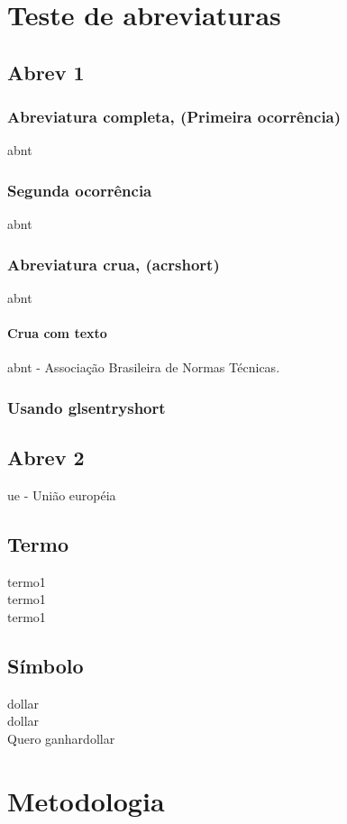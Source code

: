 \documentclass[12pt,a4paper,oneside,brazil]{abntex2}
\begin{document}
\chapter{Teste de abreviaturas}
\section{Abrev 1}
\subsection{Abreviatura completa, (Primeira ocorrência)}
\gls{abnt}
\subsection{Segunda ocorrência}
\gls{abnt}
\subsection{Abreviatura crua, (acrshort)}
\acrshort{abnt}
\subsubsection{Crua com texto}
\acrshort{abnt} - Associação Brasileira de Normas Técnicas.
\subsection{Usando glsentryshort}

\section{Abrev 2}
\gls{ue} - União européia

\section{Termo}
\gls{termo1}\\
\gls{termo1}\\
\acrshort{termo1}

\section{Símbolo}
\gls{dollar}\\
\gls{dollar} \\
Quero ganhar\acrshort{dollar}

\chapter{Metodologia}
\lipsum[8-9]
\end{document}
